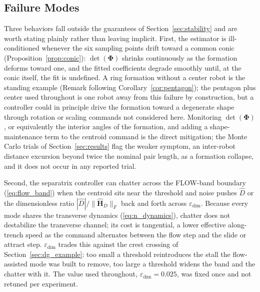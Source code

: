 \documentclass[lettersize,journal]{IEEEtran}
\begin{document}
\subsection{Failure Modes}

Three behaviors fall outside the guarantees of
Section~\ref{sec:stability} and are worth stating plainly rather than
leaving implicit. First, the estimator is ill-conditioned whenever the
six sampling points drift toward a common conic
(Proposition~\ref{prop:conic}): $\det(\boldsymbol{\Phi})$ shrinks
continuously as the formation deforms toward one, and the fitted
coefficients degrade smoothly until, at the conic itself, the fit is
undefined. A ring formation without a center robot is the standing
example (Remark following Corollary~\ref{cor:pentagon}); the pentagon
plus center used throughout is one robot away from this failure by
construction, but a controller could in principle drive the formation
toward a degenerate shape through rotation or scaling commands not
considered here. Monitoring $\det(\boldsymbol{\Phi})$, or equivalently
the interior angles of the formation, and adding a shape-maintenance
term to the centroid command is the direct mitigation; the Monte Carlo
trials of Section~\ref{sec:results} flag the weaker symptom, an
inter-robot distance excursion beyond twice the nominal pair length, as
a formation collapse, and it does not occur in any reported trial.

Second, the separatrix controller can chatter across the FLOW-band
boundary (\ref{eq:flow_band}) when the centroid sits near the threshold
and noise pushes $\hat{D}$ or the dimensionless ratio
$|\hat{D}|/\|\hat{\mathbf{H}}_D\|_F$ back and forth across
$\varepsilon_{\text{dim}}$. Because every mode shares the transverse
dynamics (\ref{eq:n_dynamics}), chatter does not destabilize the
transverse channel; its cost is tangential, a lower effective
along-trench speed as the command alternates between the flow step and
the slide or attract step. $\varepsilon_{\text{dim}}$ trades this
against the crest crossing of Section~\ref{sec:dg_example}: too small a
threshold reintroduces the stall the flow-assisted mode was built to
remove, too large a threshold widens the band and the chatter with it.
The value used throughout, $\varepsilon_{\text{dim}} = 0.025$, was fixed
once and not retuned per experiment.
\end{document}
